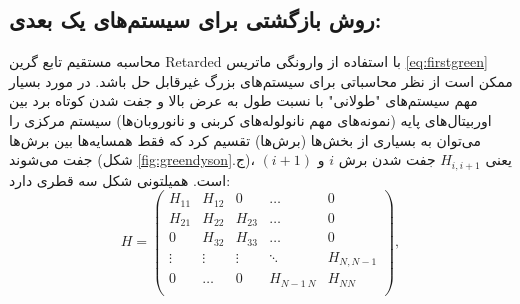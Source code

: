 \subsection{روش بازگشتی برای سیستم‌های یک بعدی:}
محاسبه مستقیم تابع گرین \gls{Retarded} با استفاده از وارونگی ماتریس \ref{eq:firstgreen} ممکن است از نظر محاسباتی برای سیستم‌های بزرگ غیرقابل حل باشد. در مورد بسیار مهم سیستم‌های "طولانی" با نسبت طول به عرض بالا و جفت شدن کوتاه برد بین اوربیتال‌های پایه (نمونه‌های مهم نانولوله‌های کربنی و نانوروبان‌ها) سیستم مرکزی را می‌توان به بسیاری از بخش‌ها (برش‌ها) تقسیم کرد که فقط همسایه‌ها بین برش‌ها جفت می‌شوند (شکل \ref{fig:greendyson}.ج)، یعنی $H_{i,i+1}$ جفت شدن برش $i$ و $(i + 1)$ است. همیلتونی شکل سه قطری دارد:
\begin{equation}
    H=\left( \begin{matrix}
           {{H}_{11}} & {{H}_{12}} & 0 & \ldots  & 0  \\
           {{H}_{21}} & {{H}_{22}} & {{H}_{23}} & \ldots  & 0  \\
           0 & {{H}_{32}} & {{H}_{33}} & \ldots  & 0  \\
           \vdots  & \vdots  & \vdots  & \ddots  & {{H}_{N,N-1}}  \\
           0 & \ldots  & 0 & {{H}_{N-1\ N}} & {{H}_{NN}}  \\
        \end{matrix} \right),
\end{equation}

